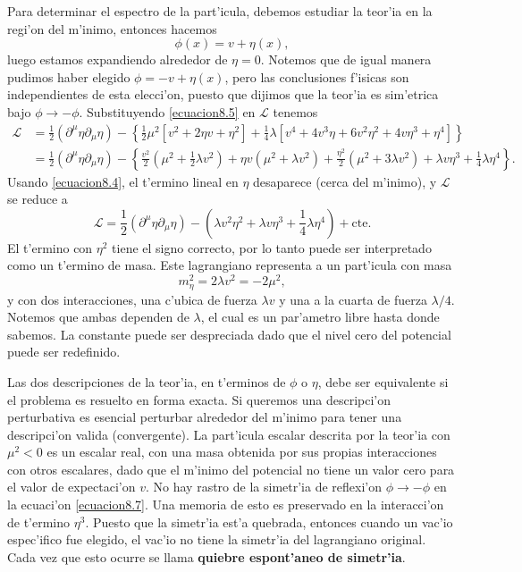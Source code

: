 Para determinar el espectro de la part'icula, debemos estudiar la teor'ia en la regi'on del m'inimo, entonces hacemos
\begin{equation}\label{ecuacion8.5}
\phi(x)=v+\eta(x),
\end{equation}
luego estamos expandiendo alrededor de $\eta=0$.
  Notemos que de igual manera pudimos haber elegido $\phi=-v+\eta(x)$,
  pero las conclusiones f'isicas son independientes de esta elecci'on, puesto que dijimos que la teor'ia es sim'etrica bajo $\phi\rightarrow-\phi$.
  Substituyendo \eqref{ecuacion8.5} en $\mathcal{L}$
  tenemos
\begin{equation}
\begin{aligned}
\mathcal{L}&=\frac{1}{2}\left(\partial^{\mu}\eta\partial_{\mu}\eta\right)-\left\{ \frac{1}{2}\mu^{2}\left[v^{2}+2\eta v+\eta^{2}\right]+\frac{1}{4}\lambda\left[v^{4}+4v^{3}\eta+6v^{2}\eta^{2}+4v\eta^{3}+\eta^{4}\right]\right\}\\ &=\frac{1}{2}\left(\partial^{\mu}\eta\partial_{\mu}\eta\right)-\left\{ \frac{v^{2}}{2}\left(\mu^{2}+\frac{1}{2}\lambda v^{2}\right)+\eta v\left(\mu^{2}+\lambda v^{2}\right)+\frac{\eta^{2}}{2}(\mu^{2}+3\lambda v^{2})+\lambda v\eta^{3}+\frac{1}{4}\lambda\eta^{4}\right\} .
\end{aligned}
\end{equation}
Usando \eqref{ecuacion8.4}, el t'ermino lineal en $\eta$
  desaparece (cerca del m'inimo), y $\mathcal{L}$
  se reduce a
\begin{equation}\label{ecuacion8.7}
\mathcal{L}=\frac{1}{2}\left(\partial^{\mu}\eta\partial_{\mu}\eta\right)-\left(\lambda v^{2}\eta^{2}+\lambda v\eta^{3}+\frac{1}{4}\lambda\eta^{4}\right)+\text{cte}.
\end{equation} 
El t'ermino con $\eta^{2}$
  tiene el signo correcto, por lo tanto puede ser interpretado como un t'ermino de masa. Este lagrangiano representa a un part'icula con masa
\begin{equation}
m_{\eta}^{2}=2\lambda v^{2}=-2\mu^{2},
\end{equation}
y con dos interacciones, una c'ubica de fuerza $\lambda v$
  y una a la cuarta de fuerza $\lambda/4$.
  Notemos que ambas dependen de $\lambda$,
  el cual es un par'ametro libre hasta donde sabemos. La constante puede ser despreciada dado que el nivel cero del potencial puede ser redefinido.

Las dos descripciones de la teor'ia, en t'erminos de $\phi$
  o $\eta$,
  debe ser equivalente si el problema es resuelto en forma exacta. Si queremos una descripci'on perturbativa es esencial perturbar alrededor del m'inimo para tener una descripci'on valida (convergente). La part'icula escalar descrita por la teor'ia con $\mu^{2}<0$
  es un escalar real, con una masa obtenida por sus propias interacciones con otros escalares, dado que el m'inimo del potencial no tiene un valor cero para el valor de expectaci'on $v$.
  No hay rastro de la simetr'ia de reflexi'on $\phi\rightarrow-\phi$
  en la ecuaci'on \eqref{ecuacion8.7}. Una memoria de esto es preservado en la interacci'on de t'ermino $\eta^{3}$. Puesto que la simetr'ia est'a quebrada, entonces cuando un vac'io espec'ifico fue elegido, el vac'io no tiene la simetr'ia del lagrangiano original. Cada vez que esto ocurre se llama \textbf{quiebre espont'aneo de simetr'ia}.
